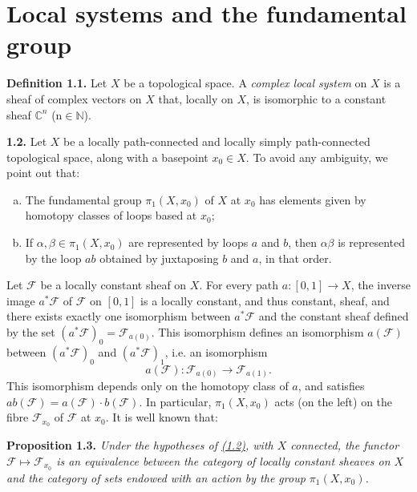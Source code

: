 \documentclass{report}
\newenvironment{itenv}[1]
  {\phantomsection\par\medskip\noindent\textbf{#1.}\itshape}
  {\medskip}
\newenvironment{rmenv}[1]
  {\phantomsection\par\medskip\noindent\textbf{#1.}\rmfamily}
  {\medskip}
\newcommand{\scr}[1]{{\mathscr{#1}}}
\begin{document}
\section{Local systems and the fundamental group}
\label{I.1}

\begin{rmenv}{Definition 1.1}
\label{I.1.1}
  Let $X$ be a topological space.
  A \emph{complex local system} on $X$ is a sheaf of complex vectors on $X$ that, locally on $X$, is isomorphic to a constant sheaf $\mathbb{C}^n$ (n$\in\mathbb{N}$).
\end{rmenv}

\begin{rmenv}{1.2}
\label{I.1.2}
  Let $X$ be a locally path-connected and locally simply path-connected topological space, along with a basepoint $x_0\in X$.
  To avoid any ambiguity, we point out that:
  \begin{enumerate}[a)]
    \item The fundamental group $\pi_1(X,x_0)$ of $X$ at $x_0$ has elements given by homotopy classes of loops based at $x_0$;
    \item If $\alpha,\beta\in\pi_1(X,x_0)$ are represented by loops $a$ and $b$, then $\alpha\beta$ is represented by the loop $ab$ obtained by juxtaposing $b$ and $a$, in that order.
  \end{enumerate}

  Let $\scr{F}$ be a locally constant sheaf on $X$.
  For every path $a\colon[0,1]\to X$, the inverse image $a^*\scr{F}$ of $\scr{F}$ on $[0,1]$ is a locally constant, and thus constant, sheaf, and there exists exactly one isomorphism between $a^*\scr{F}$ and the constant sheaf defined by the set $(a^*\scr{F})_0 = \scr{F}_{a(0)}$.
  This isomorphism defines an isomorphism $a(\scr{F})$ between $(a^*\scr{F})_0$ and $(a^*\scr{F})_1$, i.e. an isomorphism
  \[
    a(\scr{F})\colon \scr{F}_{a(0)} \to \scr{F}_{a(1)}.
  \]
  This isomorphism depends only on the homotopy class of $a$, and satisfies $ab(\scr{F}) = a(\scr{F})\cdot b(\scr{F})$.
  In particular, $\pi_1(X,x_0)$ acts (on the left) on the fibre $\scr{F}_{x_0}$ of $\scr{F}$ at $x_0$.
  It is well known that:
\end{rmenv}

\begin{itenv}{Proposition 1.3}
\label{I.1.3}
  Under the hypotheses of \hyperref[I.1.2]{(1.2)}, with $X$ connected, the functor $\scr{F}\mapsto\scr{F}_{x_0}$ is an equivalence between the category of locally constant sheaves on $X$ and the category of sets endowed with an action by the group $\pi_1(X,x_0)$.
\end{itenv}
\end{document}
